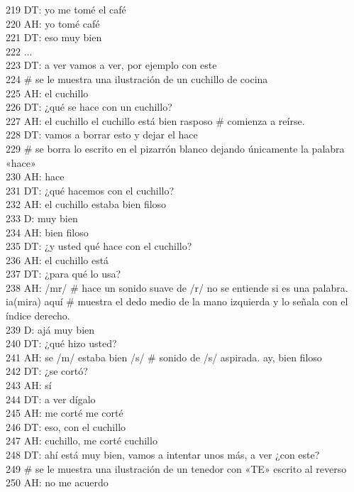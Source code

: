 219 DT: yo me tomé el café\\
220 AH: yo tomé café\\
221 DT: eso muy bien\\
222 ...\\
223 DT: a ver vamos a ver, por ejemplo con este\\
224 \# se le muestra una ilustración de un cuchillo de cocina\\
225 AH: el cuchillo\\
226 DT: ¿qué se hace con un cuchillo?\\
227 AH: el cuchillo el cuchillo está bien rasposo \# comienza a reírse.\\
228 DT: vamos a borrar esto y dejar el hace\\
229 \# se borra lo escrito en el pizarrón blanco dejando únicamente la palabra «hace»\\
230 AH: hace\\
231 DT: ¿qué hacemos con el cuchillo?\\
232 AH: el cuchillo estaba bien filoso\\
233 D: muy bien\\
234 AH: bien filoso\\
235 DT: ¿y usted qué hace con el cuchillo?\\
236 AH: el cuchillo está\\
237 DT: ¿para qué lo usa?\\
238 AH: /mr/ \# hace un sonido suave de /r/ no se entiende si es una palabra. ia(mira) aquí \# muestra el dedo medio de la mano izquierda y lo señala con el índice derecho.\\
239 D: ajá muy bien\\
240 DT: ¿qué hizo usted?\\
241 AH: se /m/ estaba bien /s/ \# sonido de /s/ aspirada. ay, bien filoso\\
242 DT: ¿se cortó?\\
243 AH: sí\\
244 DT: a ver dígalo\\
245 AH: me corté me corté\\
246 DT: eso, con el cuchillo\\
247 AH: cuchillo, me corté cuchillo\\
248 DT: ahí está muy bien, vamos a intentar unos más, a ver ¿con este?\\
249 \# se le muestra una ilustración de un tenedor con «TE» escrito al reverso\\
250 AH: no me acuerdo\\
